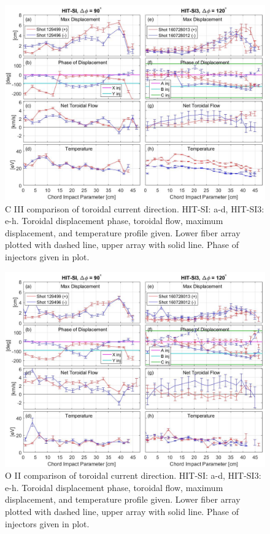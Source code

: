 \begin{figure}
\hspace*{-10ex}\includegraphics[width=7in]{C_III_Compare_1}\caption{C III comparison of toroidal current direction. HIT-SI: a-d, HIT-SI3: e-h. Toroidal displacement phase, toroidal flow, maximum displacement, and temperature profile given. Lower fiber array plotted with dashed line, upper array with solid line. Phase of injectors given in plot.}\label{Fig::PosNeg_HIT-SI3}
\end{figure}
\begin{figure}
\hspace*{-10ex}\includegraphics[width=7in]{O_II_Compare_1}\caption{O II comparison of toroidal current direction. HIT-SI: a-d, HIT-SI3: e-h. Toroidal displacement phase, toroidal flow, maximum displacement, and temperature profile given. Lower fiber array plotted with dashed line, upper array with solid line. Phase of injectors given in plot.}\label{Fig::PosNeg_HIT_SI}
\end{figure}


